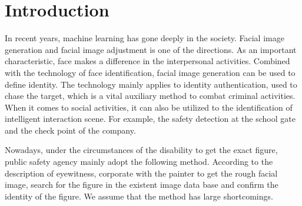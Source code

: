 \section{Introduction}
In recent years, machine learning has gone deeply in the society. Facial image generation and facial image adjustment is one of the directions. As an important characteristic, face makes a difference in the interpersonal activities. Combined with the technology of face identification, facial image generation can be used to define identity. The technology mainly applies to identity authentication, used to chase the target, which is a vital auxiliary method to combat criminal activities. When it comes to social activities, it can also be utilized to the identification of intelligent interaction scene. For example, the safety detection at the school gate and the check point of the company.

Nowadays, under the circumstances of the disability to get the exact figure, public safety agency mainly adopt the following method. According to the description of eyewitness, corporate with the painter to get the rough facial image, search for the figure in the existent image data base and confirm the identity of the figure. We assume that the method has large shortcomings. 